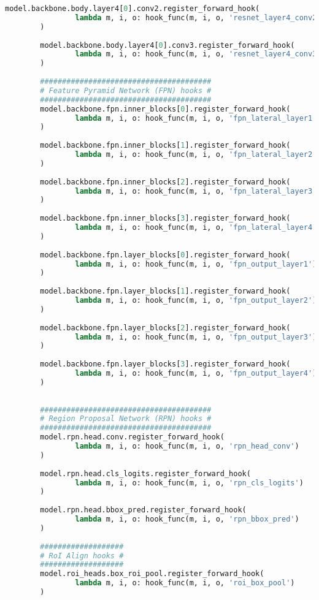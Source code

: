 \begin{lstlisting}[language=Python,caption=Hooking insight informations from Mask R-CNN, label=lst:inference-insight]
		model.backbone.body.layer4[0].conv2.register_forward_hook(
				lambda m, i, o: hook_func(m, i, o, 'resnet_layer4_conv2')
		)
		
		model.backbone.body.layer4[0].conv3.register_forward_hook(
				lambda m, i, o: hook_func(m, i, o, 'resnet_layer4_conv3')
		)
		
		#######################################
		# Feature Pyramid Network (FPN) hooks #
		#######################################
		model.backbone.fpn.inner_blocks[0].register_forward_hook(
				lambda m, i, o: hook_func(m, i, o, 'fpn_lateral_layer1')
		)
		
		model.backbone.fpn.inner_blocks[1].register_forward_hook(
				lambda m, i, o: hook_func(m, i, o, 'fpn_lateral_layer2')
		)
		
		model.backbone.fpn.inner_blocks[2].register_forward_hook(
				lambda m, i, o: hook_func(m, i, o, 'fpn_lateral_layer3')
		)
		
		model.backbone.fpn.inner_blocks[3].register_forward_hook(
				lambda m, i, o: hook_func(m, i, o, 'fpn_lateral_layer4')
		)
		
		model.backbone.fpn.layer_blocks[0].register_forward_hook(
				lambda m, i, o: hook_func(m, i, o, 'fpn_output_layer1')
		)
		
		model.backbone.fpn.layer_blocks[1].register_forward_hook(
				lambda m, i, o: hook_func(m, i, o, 'fpn_output_layer2')
		)
		
		model.backbone.fpn.layer_blocks[2].register_forward_hook(
				lambda m, i, o: hook_func(m, i, o, 'fpn_output_layer3')
		)
		
		model.backbone.fpn.layer_blocks[3].register_forward_hook(
				lambda m, i, o: hook_func(m, i, o, 'fpn_output_layer4')
		)
		
		
		#######################################
		# Region Proposal Network (RPN) hooks #
		#######################################
		model.rpn.head.conv.register_forward_hook(
				lambda m, i, o: hook_func(m, i, o, 'rpn_head_conv')
		)
		
		model.rpn.head.cls_logits.register_forward_hook(
				lambda m, i, o: hook_func(m, i, o, 'rpn_cls_logits')
		)
		
		model.rpn.head.bbox_pred.register_forward_hook(
				lambda m, i, o: hook_func(m, i, o, 'rpn_bbox_pred')
		)
		
		###################
		# RoI Align hooks #
		###################
		model.roi_heads.box_roi_pool.register_forward_hook(
				lambda m, i, o: hook_func(m, i, o, 'roi_box_pool')
		)
		

\end{lstlisting}
